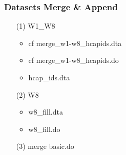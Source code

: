 \documentclass[12pt]{article}
\begin{document}
\subsubsection{Datasets Merge \& Append}
\begin{itemize}
    \item[(1)] W1\_W8
    \begin{itemize}
        \item cf merge\_w1-w8\_hcapids.dta
        \item cf merge\_w1-w8\_hcapids.do
        \item hcap\_ids.dta
    \end{itemize}
    \item[(2)] W8
    \begin{itemize}
        \item w8\_fill.dta
        \item w8\_fill.do
    \end{itemize}
    \item[(3)] merge basic.do
\end{itemize}
\end{document}
